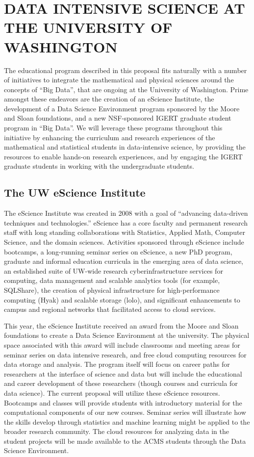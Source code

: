 \section{DATA INTENSIVE SCIENCE AT THE UNIVERSITY OF WASHINGTON}
\vspace{-0.8em}
The educational program described in this proposal fits naturally with a number of initiatives to integrate the mathematical and physical sciences around the concepts of ``Big Data'', that are ongoing at the University of Washington. Prime amongst these endeavors are the creation of an eScience Institute, the development of a Data Science Environment program sponsored by the Moore and Sloan foundations, and a new NSF-sponsored IGERT graduate student program in ``Big Data''. We will leverage these programs throughout this initiative by enhancing the curriculum and research experiences of the mathematical and statistical students in data-intensive science, by providing the resources to enable hands-on research experiences, and by engaging the IGERT graduate students in working with the undergraduate students.

\subsection{The UW eScience Institute}
\vspace{-0.8em}
The eScience Institute was created in 2008 with a goal of “advancing data-driven techniques and technologies.” eScience has a core faculty and permanent research staff with long standing collaborations with Statistics, Applied Math, Computer Science, and the domain sciences. Activities sponsored through eScience include bootcamps, a long-running seminar series on eScience, a new PhD program, graduate and informal education curricula in the emerging area of data science, an established suite of UW-wide research cyberinfrastructure services for computing, data management and scalable analytics tools (for example, SQLShare), the creation of physical infrastructure for high-performance computing (Hyak) and scalable storage (lolo), and significant enhancements to campus and regional networks that facilitated access to cloud services.

This year, the eScience Institute received an award from the Moore and Sloan foundations to create a Data Science Environment at the university. The physical space associated with this award will include classrooms and meeting areas for seminar series on data intensive research, and free cloud computing resources for data storage and analysis. The program itself will focus on career paths for researchers at the interface of science and data but will include the educational and career development of these researchers (though courses and curricula for data science). The current proposal will utilize these eScience resources.
 Bootcamps and classes will provide students with introductory material for the computational components of our new courses. Seminar series will illustrate how the skills develop through statistics and machine learning might be applied to the broader research community. The cloud resources for analyzing data in the student projects will be made available to the ACMS students through the Data Science Environment.

